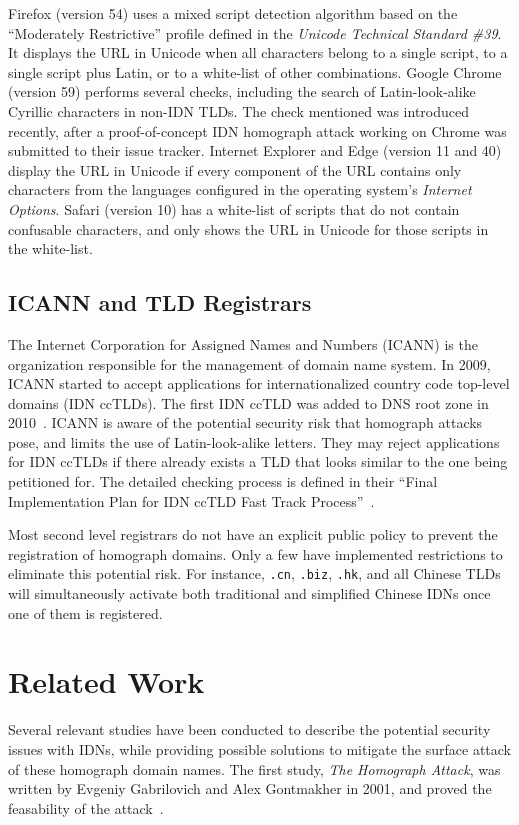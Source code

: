 \documentclass[letterpaper,twocolumn,10pt]{article}
\begin{document}
Firefox (version 54) uses a mixed script detection algorithm based on the ``Moderately Restrictive'' profile defined in the \textit{Unicode Technical Standard \#39}.
It displays the URL in Unicode when all characters belong to a single script, to a single script plus Latin, or to a white-list of other combinations.
Google Chrome (version 59) performs several checks, including the search of Latin-look-alike Cyrillic characters in non-IDN TLDs.
The check mentioned was introduced recently, after a proof-of-concept IDN homograph attack working on Chrome was submitted to their issue tracker.
Internet Explorer and Edge (version 11 and 40) display the URL in Unicode if every component of the URL contains only characters from the languages configured in the operating system's \textit{Internet Options}.
Safari (version 10) has a white-list of scripts that do not contain confusable characters, and only shows the URL in Unicode for those scripts in the white-list.

\subsection{ICANN and TLD Registrars}
The Internet Corporation for Assigned Names and Numbers (ICANN) is the organization responsible for the management of domain name system.
In 2009, ICANN started to accept applications for internationalized country code top-level domains (IDN ccTLDs).
The first IDN ccTLD was added to DNS root zone in 2010~\cite{mac2010}.
ICANN is aware of the potential security risk that homograph attacks pose, and limits the use of Latin-look-alike letters.
They may reject applications for IDN ccTLDs if there already exists a TLD that looks similar to the one being petitioned for.
The detailed checking process is defined in their ``Final Implementation Plan for IDN ccTLD Fast Track Process''~\cite{icann2013}.

Most second level registrars do not have an explicit public policy to prevent the registration of homograph domains.
Only a few have implemented restrictions to eliminate this potential risk.
For instance, \texttt{.cn}, \texttt{.biz}, \texttt{.hk}, and all Chinese TLDs will simultaneously activate both traditional and simplified Chinese IDNs once one of them is registered.

\section{Related Work}
Several relevant studies have been conducted to describe the potential security issues with IDNs, while providing possible solutions to mitigate the surface attack of these homograph domain names. The first study, \textit{The Homograph Attack}, was written by Evgeniy Gabrilovich and Alex Gontmakher in 2001, and proved the feasability of the attack~\cite{gabrilovich2002}.
\end{document}
